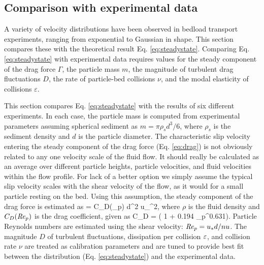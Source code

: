 \subsection{Comparison with experimental data}
\label{sec:langexperimentcomparison}

A variety of velocity distributions have been observed in bedload transport experiments, ranging from exponential to Gaussian in shape. 
This section compares these with the theoretical result Eq. \ref{eq:steadystate}.
Comparing Eq. \ref{eq:steadystate} with experimental data requires values for the steady component of the drag force $\Gamma$, the particle mass $m$, the magnitude of turbulent drag fluctuations $D$, the rate of particle-bed collisions $\nu$, and the modal elasticity of collisions $\varepsilon$.

This section compares Eq. \ref{eq:steadystate} with the results of six different experiments.
In each case, the particle mass is computed from experimental parameters assuming spherical sediment as $m = \pi \rho_s d^3/6$, where $\rho_s$ is the sediment density and $d$ is the particle diameter.
The characteristic slip velocity entering the steady component of the drag force (Eq. \ref{eq:drag}) is not obviously related to any one velocity scale of the fluid flow. It should really be calculated as an average over different particle heights, particle velocities, and fluid velocities within the flow profile. For lack of a better option we simply assume the typical slip velocity scales with the shear velocity of the flow, as it would for a small particle resting on the bed. Using this assumption, the steady component of the drag force is estimated as
\be \Gamma =  \rho C_D(\Rey_p) d^2 u_\ast^2,\ee
where $\rho$ is the fluid density and $C_D(\mbox{\textit{Re}}_p)$ is the drag coefficient, given as \citep{Clift1978,Gonzalez2017}
\be C_D = ( 1 + 0.194 \Rey_p^{0.631}). \ee
Particle Reynolds numbers are estimated using the shear velocity: $\mbox{\textit{Re}}_p= u_\ast d/nu$. 
The magnitude $D$ of turbulent fluctuations, dissipation per collision $\varepsilon$, and collision rate $\nu$ are treated as calibration parameters and are tuned to provide best fit between the distribution (Eq. \ref{eq:steadystate}) and the experimental data.

